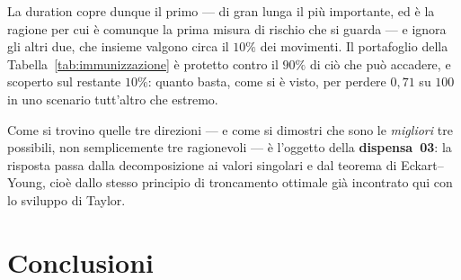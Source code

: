 \documentclass[11pt,a4paper]{article}
\theoremstyle{plain}
\theoremstyle{definition}
\theoremstyle{remark}
\begin{document}
La duration copre dunque il primo --- di gran lunga il più importante, ed è la ragione per cui
è comunque la prima misura di rischio che si guarda --- e ignora gli altri due, che insieme
valgono circa il $10\%$ dei movimenti. Il portafoglio della Tabella~\ref{tab:immunizzazione}
è protetto contro il $90\%$ di ciò che può accadere, e scoperto sul restante $10\%$: quanto
basta, come si è visto, per perdere $0{,}71$ su $100$ in uno scenario tutt'altro che estremo.

Come si trovino quelle tre direzioni --- e come si dimostri che sono le \emph{migliori} tre
possibili, non semplicemente tre ragionevoli --- è l'oggetto della \textbf{dispensa~03}: la
risposta passa dalla decomposizione ai valori singolari e dal teorema di Eckart--Young, cioè
dallo stesso principio di troncamento ottimale già incontrato qui con lo sviluppo di Taylor.

\section{Conclusioni}
\end{document}
